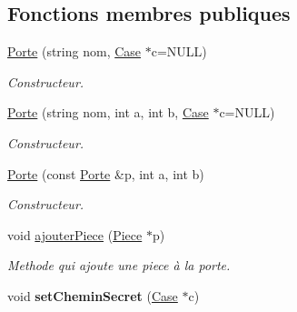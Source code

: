 \subsection*{\-Fonctions membres publiques}
\begin{DoxyCompactItemize}
\item 
\hypertarget{classPorte_a49db32e64af8caf782fe54bffa572d7b}{\hyperlink{classPorte_a49db32e64af8caf782fe54bffa572d7b}{\-Porte} (string nom, \hyperlink{classCase}{\-Case} $\ast$c=\-N\-U\-L\-L)}\label{classPorte_a49db32e64af8caf782fe54bffa572d7b}

\begin{DoxyCompactList}\small\item\em \-Constructeur. \end{DoxyCompactList}\item 
\hypertarget{classPorte_a827b8c0f75a4e19c5763523462c6f224}{\hyperlink{classPorte_a827b8c0f75a4e19c5763523462c6f224}{\-Porte} (string nom, int a, int b, \hyperlink{classCase}{\-Case} $\ast$c=\-N\-U\-L\-L)}\label{classPorte_a827b8c0f75a4e19c5763523462c6f224}

\begin{DoxyCompactList}\small\item\em \-Constructeur. \end{DoxyCompactList}\item 
\hypertarget{classPorte_aa3fdf234c17c43b98bdec5f9d69778a6}{\hyperlink{classPorte_aa3fdf234c17c43b98bdec5f9d69778a6}{\-Porte} (const \hyperlink{classPorte}{\-Porte} \&p, int a, int b)}\label{classPorte_aa3fdf234c17c43b98bdec5f9d69778a6}

\begin{DoxyCompactList}\small\item\em \-Constructeur. \end{DoxyCompactList}\item 
void \hyperlink{classPorte_adc13e346f7349fd3dc901ff2197f9106}{ajouter\-Piece} (\hyperlink{classPiece}{\-Piece} $\ast$p)
\begin{DoxyCompactList}\small\item\em \-Methode qui ajoute une piece à la porte. \end{DoxyCompactList}\item 
\hypertarget{classPorte_ad7f509198fda1bc591bb654b3a3b1fa2}{void {\bfseries set\-Chemin\-Secret} (\hyperlink{classCase}{\-Case} $\ast$c)}\label{classPorte_ad7f509198fda1bc591bb654b3a3b1fa2}


\end{DoxyCompactItemize}
